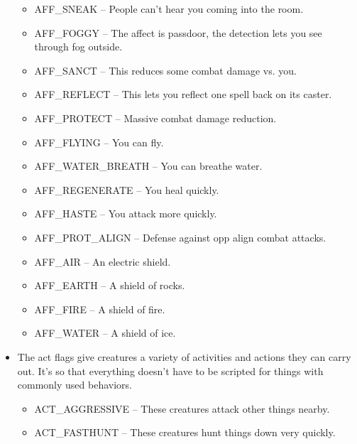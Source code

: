 \begin{itemize}
\begin{itemize}
\item AFF\_SNEAK -- People can't hear you coming into the room.

\item AFF\_FOGGY -- The affect is passdoor, the detection lets you see through fog outside.

\item AFF\_SANCT -- This reduces some combat damage vs. you.

\item AFF\_REFLECT -- This lets you reflect one spell back on its caster.

\item AFF\_PROTECT -- Massive combat damage reduction.

\item AFF\_FLYING -- You can fly.

\item AFF\_WATER\_BREATH -- You can breathe water.

\item AFF\_REGENERATE -- You heal quickly.

\item AFF\_HASTE -- You attack more quickly.

\item AFF\_PROT\_ALIGN -- Defense against opp align combat attacks.

\item AFF\_AIR -- An electric shield.

\item AFF\_EARTH -- A shield of rocks.

\item AFF\_FIRE  -- A shield of fire.

\item AFF\_WATER -- A shield of ice.
        
\end{itemize}


\item The act flags give creatures a variety of activities and actions
they can carry out. It's so that everything doesn't have to be
scripted for things with commonly used behaviors.

\begin{itemize}

\item ACT\_AGGRESSIVE -- These creatures attack other things nearby.

\item ACT\_FASTHUNT  -- These creatures hunt things down very quickly.


\end{itemize}
\end{itemize}
